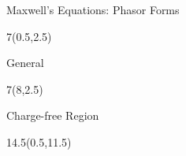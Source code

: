 \begin{frame}{Maxwell's Equations: Phasor Forms}
\begin{textblock}{7}(0.5,2.5)
\begin{myblock}[0.95]{General}
\begin{small}
\vspace{-18pt}
\end{small}
\vspace{-12pt}
\end{myblock}
\end{textblock}

\begin{textblock}{7}(8,2.5)
\begin{myblock}[0.9]{Charge-free Region}
\begin{small}
	\vspace{-18pt} 
\end{small}
\vspace{-12pt}
\end{myblock}
\end{textblock}

\begin{textblock}{14.5}(0.5,11.5)



\end{textblock}
\end{frame}


